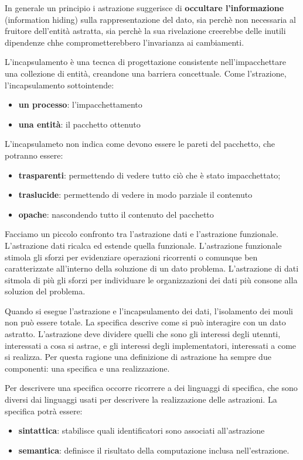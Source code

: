 \documentclass[a4paper,18pt]{extarticle}
\begin{document}
In generale un principio i astrazione suggerisce di \textbf{occultare l'informazione} (information hiding) sulla rappresentazione del dato, sia perchè non necessaria al fruitore dell'entità astratta, sia perchè la sua rivelazione creerebbe delle inutili dipendenze chhe comprometterebbero l'invarianza ai cambiamenti. 

L'incapsulamento è una tecnca di progettazione consistente nell'impacchettare una collezione di entità, creandone una barriera concettuale. Come l'strazione, l'incapsulamento sottointende:

\begin{itemize}
  \item \textbf{un processo}: l'impacchettamento
  \item \textbf{una entità}: il pacchetto ottenuto
\end{itemize}

L'incapsulameto non indica come devono essere le pareti del pacchetto, che potranno essere:
\begin{itemize}
  \item \textbf{trasparenti}: permettendo di vedere tutto ciò che è stato impacchettato;
  \item \textbf{traslucide}: permettendo di vedere in modo parziale il contenuto
  \item \textbf{opache}: nascondendo tutto il contenuto del pacchetto
\end{itemize}

Facciamo un piccolo confronto tra l'astrazione dati e l'astrazione funzionale. L'astrazione dati ricalca ed estende quella funzionale. L'astrazione funzionale stimola gli sforzi per evidenziare operazioni ricorrenti o comunque ben caratterizzate all'interno della soluzione di un dato problema. L'astrazione di dati sitmola di più gli sforzi per individuare le organizzazioni dei dati più consone alla soluzion del problema.

Quando si esegue l'astrazione e l'incapsulamento dei dati, l'isolamento dei mouli non può essere totale. La specifica descrive come si può interagire con un dato astratto. L'astrazione deve dividere quelli che sono gli interessi degli utennti, interessati a cosa si astrae, e gli interessi degli implementatori, interessati a come si realizza. Per questa ragione una definizione di astrazione ha sempre due componenti: una specifica e una realizzazione.

Per descrivere una specifica occorre ricorrere a dei linguaggi di specifica, che sono diversi dai linguaggi usati per descrivere la realizzazione delle astrazioni. La specifica potrà essere:
\begin{itemize}
  \item \textbf{sintattica}: stabilisce quali identificatori sono associati all'astrazione
  \item \textbf{semantica}: definisce il risultato della computazione inclusa nell'estrazione.
\end{itemize}
\end{document}
